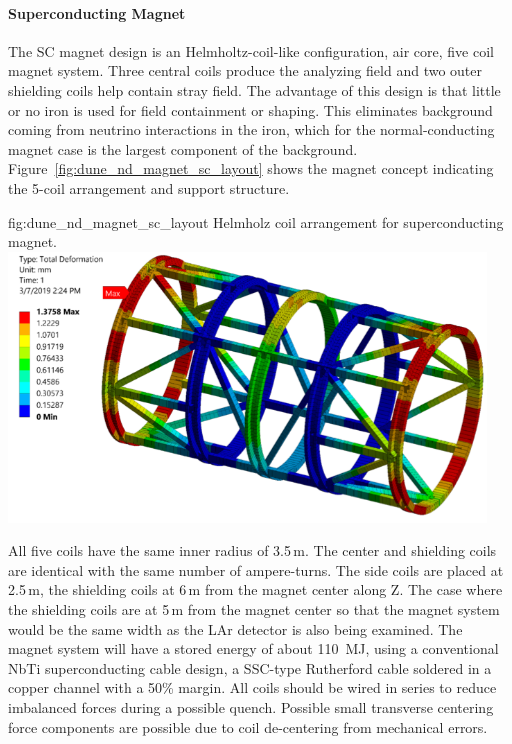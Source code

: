 \paragraph{Superconducting Magnet}
%
The SC magnet design is an Helmholtz-coil-like configuration, air core,  five coil magnet system. Three central coils produce the analyzing field and two outer shielding coils help contain stray field. The advantage of this design is that little or no iron is used for field containment or shaping. This eliminates background coming from neutrino interactions in the iron, which for the normal-conducting magnet case is the largest component of the background. Figure~\ref{fig:dune_nd_magnet_sc_layout} shows the magnet concept indicating the 5-coil arrangement and support structure. 
%
%
\begin{dunefigure}{fig:dune_nd_magnet_sc_layout}
{Helmholz coil arrangement for  superconducting magnet.}
\includegraphics[width=0.95\textwidth]{graphics/SC_mag_st.png}
\end{dunefigure}
%
All five coils have the same inner radius of 3.5\,m. The center and shielding coils are identical with the same number of ampere-turns. The side coils are placed at 2.5\,m, the shielding coils at 6\,m from the magnet center along Z.  The case where the shielding coils are at 5\,m from the magnet center so that the magnet system would be the same width as the LAr detector is also being examined.  The magnet system will have a stored energy of about 110~MJ, using a conventional NbTi superconducting cable design, a SSC-type Rutherford cable soldered in a copper channel with a 50\% margin. All coils should be wired in series to reduce imbalanced forces during a possible quench. Possible small transverse centering force components are possible due to coil de-centering from mechanical errors. 
